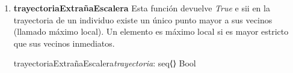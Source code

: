 \documentclass[10pt,a4paper]{article}
\begin{document}
\begin{enumerate}
\begin{proc}{trayectoriaDeLosFrutosIndividualesALargoPlazo}
{            \y \\
            (\forall i : \ent) (0 \leq i < |{\textit{pagos}}\vert \implicaLuego (\forall j : \ent)(0 \leq j < |{\textit{apuestas}}\vert \implicaLuego 
            |{\textit{pagos}[i]}\vert = |{\textit{apuestas}[j]}\vert))
            \y \\
            (\forall i : \ent)(0 \leq i < |{\textit{eventos}}\vert \implicaLuego |{\textit{eventos}[i]}\vert > 0)
            \y \\
            (\forall i : \ent)(0 \leq i < |{\textit{eventos}}\vert \implicaLuego |{\textit{eventos}[0]}\vert = |{\textit{eventos}[i]}\vert) \y \\
            (\forall i : \ent) (0 \leq i < |{\textit{eventos}}\vert \implicaLuego 
            (\forall j : \ent)(0 \leq j < |{\textit{eventos}[i]}\vert {} \leq \textit{eventos}[i][j] < |{\textit{pagos}[i]}\vert))
        }


    \end{proc}

    {\\\sum_{n = 0}^{|{\textit{apuestasIndividuo}}} \textit{apuestasIndividuo} [n]}





    \item \textbf{trayectoriaExtrañaEscalera} Esta función devuelve \textit{True} e sii en la trayectoria de un individuo existe un único punto mayor a sus vecinos (llamado máximo local). Un elemento es máximo local si es mayor estricto que sus vecinos inmediatos.
    
    \begin{proc}{trayectoriaExtrañaEscalera}{\In \textit{trayectoria}: seq⟨\real⟩} {Bool}


\end{proc}
\end{enumerate}
\end{document}
